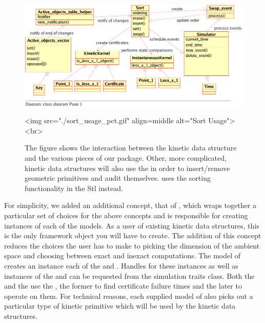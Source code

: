\begin{figure}
\begin{ccTexOnly}
\begin{center}
\includegraphics[scale=.8,viewport=0 18 470 250, clip]{Kinetic_data_structures/sort_usage_pct}
\end{center}
\end{ccTexOnly}
\begin{ccHtmlOnly}
<img src="./sort_usage_pct.gif" align=middle alt="Sort Usage"><br>
\end{ccHtmlOnly}
\caption{\label{fig:kds_uml_usage} The figure shows the interaction between
  the  kinetic data structure and
  the various pieces of our package.  Other, more complicated, kinetic
  data structures will also use the  in order
  to insert/remove geometric primitives and audit
  themselves.  uses the sorting
  functionality in the {\sc Stl} instead.}
\end{figure}

For simplicity, we added an additional concept, that of
, which wraps together a particular set of
choices for the above concepts and is responsible for creating
instances of each of the models. As a user of existing kinetic data
structures, this is the only framework object you will have to
create. The addition of this concept reduces the choices the user has
to make to picking the dimension of the ambient space and choosing
between exact and inexact computations. The model of
 creates an instance each of the
 and . Handles for
these instances as well as instances of the 
and  can be requested from the simulation
traits class. Both the  and the
 use the ,
 the former to find certificate failure times and the later to operate
on them. For technical reasons, each supplied model of
 also picks out a particular type of
kinetic primitive which will be used by the kinetic data structures.





